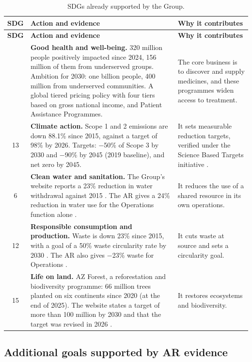 \begin{xltabular}{\linewidth}{@{}c>{\hsize}Y>{\hsize}Y@{}}
\caption{SDGs already supported by the Group.}\label{tab:ods-atuais}\\*
\toprule
\textbf{SDG} & \textbf{Action and evidence} & \textbf{Why it contributes} \\*
\midrule
\endfirsthead
\toprule
\textbf{SDG} & \textbf{Action and evidence} & \textbf{Why it contributes} \\*
\midrule
\endhead
\bottomrule
{} & \textbf{Good health and well-being.} 320 million people positively impacted since 2024, 156 million of them from underserved groups. Ambition for 2030: one billion people, 400 million from underserved communities. A global tiered pricing policy with four tiers based on gross national income, and Patient Assistance Programmes. \cite[pp.~5, 41]{AR} & The core business is to discover and supply medicines, and these programmes widen access to treatment. \\
13 & \textbf{Climate action.} Scope 1 and 2 emissions are down 88.1\% since 2015, against a target of 98\% by 2026. Targets: $-$50\% of Scope 3 by 2030 and $-$90\% by 2045 (2019 baseline), and net zero by 2045. \cite[pp.~2, 42]{AR} & It sets measurable reduction targets, verified under the Science Based Targets initiative \cite[p.~42]{AR}. \\
6 & \textbf{Clean water and sanitation.} The Group's website reports a 23\% reduction in water withdrawal against 2015 \cite{NATURE}. The AR gives a 24\% reduction in water use for the Operations function alone \cite[p.~33]{AR}. & It reduces the use of a shared resource in its own operations. \\
12 & \textbf{Responsible consumption and production.} Waste is down 23\% since 2015, with a goal of a 50\% waste circularity rate by 2030 \cite{NATURE}. The AR also gives $-$23\% waste for Operations \cite[p.~33]{AR}. & It cuts waste at source and sets a circularity goal. \\
15 & \textbf{Life on land.} AZ Forest, a reforestation and biodiversity programme: 66 million trees planted on six continents since 2020 (at the end of 2025). The website states a target of more than 100 million by 2030 and that the target was revised in 2026 \cite{FOREST}. & It restores ecosystems and biodiversity. \\
\end{xltabular}

\subsection{Additional goals supported by AR evidence}

